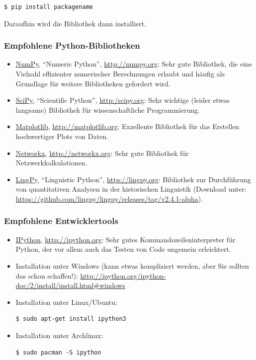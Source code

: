 \begin{verbatim}
$ pip install packagename
\end{verbatim}

Daraufhin wird die Bibliothek dann installiert.

\subsubsection{Empfohlene Python-Bibliotheken}
\begin{itemize}
\itemsep1pt\parskip0pt
\item
  {\href{http://numpy.org}{NumPy}, ``Numeric Python'',
  \url{http://numpy.org}: Sehr gute Bibliothek, die eine Vielzahl
  effizienter numerischer Berechnungen erlaubt und häufig als Grundlage
  für weitere Bibliotheken gefordert wird. }
\item
  {\href{http://scipy.org}{SciPy}, ``Scientific Python'',
  \href{http://scipy.org}{http:/scipy.org}: Sehr wichtige (leider etwas
  langsame) Bibliothek für wissenschaftliche Programmierung. }
\item
  {\href{http://matplotlib.org}{Matplotlib},
  \url{http://matplotlib.org}: Exzellente Bibliothek für das Erstellen
  hochwertiger Plots von Daten.}
\item
  {\href{http://networkx.org}{Networkx}, \url{http://networkx.org}: Sehr
  gute Bibliothek für Netzwerkkalkulationen.}
\item
  {\href{http://lingpy.org}{LingPy}, ``Linguistic Python'',
  \url{http://lingpy.org}: Bibliothek zur Durchführung von quantitativen
  Analysen in der historischen Linguistik (Download unter:
  \url{https://github.com/lingpy/lingpy/releases/tag/v2.4.1-alpha}).}
\end{itemize}


\subsubsection{\texorpdfstring{{Empfohlene
Entwicklertools}}{Empfohlene Entwicklertools}}

\begin{itemize}
\item
  {\href{http://ipython.org}{IPython}, \url{http://ipython.org}: Sehr
  gutes Kommandozeileninterpreter für Python, der vor allem auch das
  Testen von Code ungemein erleichtert. }
\item
  {Installation unter Windows (kann etwas kompliziert werden, aber Sie
  sollten das schon schaffen!):
  \url{http://ipython.org/ipython-doc/2/install/install.html\#windows}}
\item
  {Installation unter Linux/Ubuntu: }

\begin{verbatim}
$ sudo apt-get install ipython3
\end{verbatim}
\item
  {Installation unter Archlinux: }

\begin{verbatim}
$ sudo pacman -S ipython
\end{verbatim}
\end{itemize}

